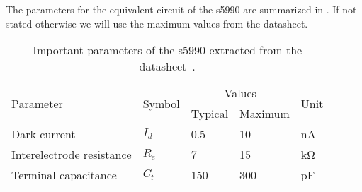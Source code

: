 The parameters for the equivalent circuit of the \gls{s5990} are summarized in .
If not stated otherwise we will use the maximum values from the datasheet.
\begin{table}[H]
	\centering
	\begin{tabular}{lllll}
		\toprule
			\multirow{2}[3]{*}{Parameter} &
			\multirow{2}[3]{*}{Symbol} &
			\multicolumn{2}{c}{Values} &
			\multirow{2}[3]{*}{Unit} \\
			\cmidrule(lr){3-4} & & Typical & Maximum & \\
		\midrule
		Dark current & $I_d$ & \num{0.5} & \num{10} & \si{\nano\ampere}\\
		Interelectrode resistance & $R_e$ & \num{7} & \num{15} & \si{\kilo\ohm}\\
		Terminal capacitance & $C_t$ & \num{150} & \num{300} & \si{\pico\farad}\\
		\bottomrule	
	\end{tabular}
	\caption{Important parameters of the \gls{s5990} extracted from the datasheet~\cite{HamamatsuPSD}.}\label{tab:psd_s5990}
\end{table}
